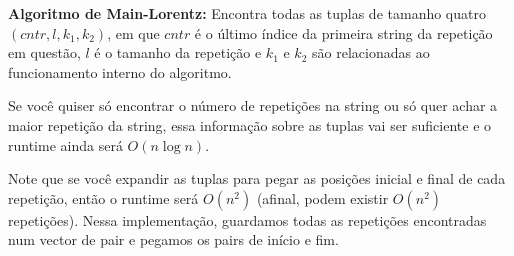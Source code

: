  \textbf{Algoritmo de Main-Lorentz:} Encontra todas as tuplas de tamanho quatro $(cntr, l, k_1, k_2)$, em que $cntr$ é o último índice da primeira string da repetição em questão, $l$ é o tamanho da repetição e $k_1$ e $k_2$ são relacionadas ao funcionamento interno do algoritmo.

 Se você quiser só encontrar o número de repetições na string ou só quer achar a maior repetição da string, essa informação sobre as tuplas vai ser suficiente e o runtime ainda será $O(n \log n)$.

Note que se você expandir as tuplas para pegar as posições inicial e final de cada repetição, então o runtime será $O(n^2)$ (afinal, podem existir $O(n^2)$ repetições). Nessa implementação, guardamos todas as repetições encontradas num vector de pair e pegamos os pairs de início e fim.

